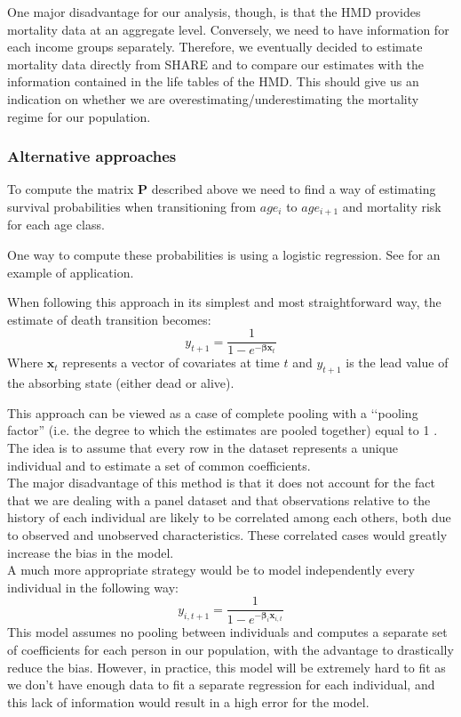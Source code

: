 One major disadvantage for our analysis, though, is that the HMD provides mortality data at an aggregate level. Conversely, we need to have information for each income groups separately.
Therefore, we eventually decided to estimate mortality data directly from SHARE and to compare our estimates with the information contained in the life tables of the HMD. This should give us an indication on whether we are overestimating/underestimating the mortality regime for our population.\\

\subsubsection{Alternative approaches}


To compute the matrix $\mathbf{P}$ described above we need to find a way of estimating survival probabilities when transitioning from $age_i$ to $age_{i+1}$ and mortality risk for each age class.

One way to compute these probabilities is using a logistic regression. See \cite{Mehta2017a} for an example of application. 

When following this approach in its simplest and most straightforward way, the estimate of death transition becomes:
\begin{equation}
y_{t+1} = \frac{1}{1-e^{-\bm{\beta} \mathbf{x}_{t}}}
\end{equation}
Where $\mathbf{x}_t$ represents a vector of covariates at time $t$ and $y_{t+1}$ is the lead value of the absorbing state (either dead or alive). 

This approach can be viewed as a case of complete pooling with a \lq\lq pooling factor''  (i.e. the degree to which the estimates are pooled together) equal to 1 \citep{Gelman2006}. The idea is to assume that every row in the dataset represents a unique individual and to estimate a set of common coefficients.\\

The major disadvantage of this method is that it does not account for the fact that we are dealing with a panel dataset and that observations relative to the history of each individual are likely to be correlated among each others, both due to observed and unobserved characteristics. 
These correlated cases would greatly increase the bias in the model. \\

A much more appropriate strategy would be to model independently every individual in the following way:
\begin{equation}
y_{i, t+1} = \frac{1}{1-e^{-\bm{\beta}_{i} \mathbf{x}_{i,t}}}
\end{equation}
This model assumes no pooling between individuals and computes a separate set of coefficients for each person in our population, with the advantage to drastically reduce the bias. However, in practice, this model will be extremely hard to fit as we don't have enough data to fit a separate regression for each individual, and this lack of information would result in a high error for the model.\\

